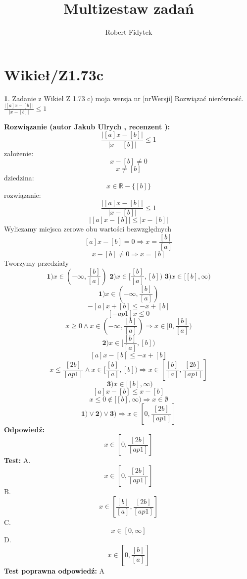 \documentclass[12pt, a4paper]{article}
\title{Multizestaw zadań}
\author{Robert Fidytek}
\date{}
\theoremstyle{definition} %
\newtheorem{zad}{}
\newcommand{\kategoria}[1]{\section{#1}} %
\newcommand{\zadStart}[1]{\begin{zad}#1\newline} %
\newcommand{\zadStop}{\end{zad}}   %
\newcommand{\rozwStart}[2]{\noindent \textbf{Rozwiązanie (autor #1 , recenzent #2): }\newline} %
\newcommand{\rozwStop}{\newline}                                            %
\newcommand{\odpStart}{\noindent \textbf{Odpowiedź:}\newline}    %
\newcommand{\odpStop}{\newline}                                             %
\newcommand{\testStart}{\noindent \textbf{Test:}\newline} %
\newcommand{\testStop}{\newline} %
\newcommand{\kluczStart}{\noindent \textbf{Test poprawna odpowiedź:}\newline} %
\newcommand{\kluczStop}{\newline} %
\begin{document}
\maketitle


\kategoria{Wikieł/Z1.73c}
\zadStart{Zadanie z Wikieł Z 1.73 c) moja wersja nr [nrWersji]}
Rozwiązać nierówność.$\frac{|[a]x-[b]|}{|x-[b]|}\leq1$
\zadStop
\rozwStart{Jakub Ulrych}{}
$$\frac{|[a]x-[b]|}{|x-[b]|}\leq1$$
założenie: $$x-[b]\neq0$$
$$x\neq[b]$$
dziedzina:$$x\in\mathbb{R}-\{[b]\}$$
rozwiązanie:$$\frac{|[a]x-[b]|}{|x-[b]|}\leq1$$
$$|[a]x-[b]|\leq|x-[b]|$$
Wyliczamy miejsca zerowe obu wartości bezwzględnych
$$[a]x-[b]=0\Rightarrow x=\frac{[b]}{[a]}$$
$$x-[b]\neq0\Rightarrow x=[b]$$
Tworzymy przedziały
$$\textbf{1)}x\in(-\infty,\frac{[b]}{[a]})\textbf{  2)}x\in[\frac{[b]}{[a]},[b])\textbf{  3)}x\in[[b],\infty)$$
$$\textbf{1)}x\in(-\infty,\frac{[b]}{[a]})$$
$$-[a]x+[b]\leq-x+[b]$$
$$[-ap1]x\leq0$$
$$x\geq0\land x\in(-\infty,\frac{[b]}{[a]})\Rightarrow x\in[0,\frac{[b]}{[a]})$$
$$\textbf{2)}x\in[\frac{[b]}{[a]},[b])$$
$$[a]x-[b]\leq-x+[b]$$
$$x\leq\frac{[2b]}{[ap1]}\land x\in[\frac{[b]}{[a]},[b])\Rightarrow x\in[\frac{[b]}{[a]},\frac{[2b]}{[ap1]}]$$
$$\textbf{  3)}x\in[[b],\infty)$$
$$[a]x-[b]\leq x-[b]$$
$$x\leq0\notin[[b],\infty)\Rightarrow x\in\emptyset$$
$$\textbf{1)} \vee \textbf{2)} \vee \textbf{3)}\Rightarrow x\in[0,\frac{[2b]}{[ap1]}]$$
\rozwStop
\odpStart
$$x\in[0,\frac{[2b]}{[ap1]}]$$
\odpStop
\testStart
A.$$x\in[0,\frac{[2b]}{[ap1]}]$$
B.$$x\in[\frac{[b]}{[a]},\frac{[2b]}{[ap1]}]$$
C.$$x\in[0,\infty]$$
D.$$x\in[0,\frac{[b]}{[a]}]$$
\testStop
\kluczStart
A
\kluczStop
\end{document}
